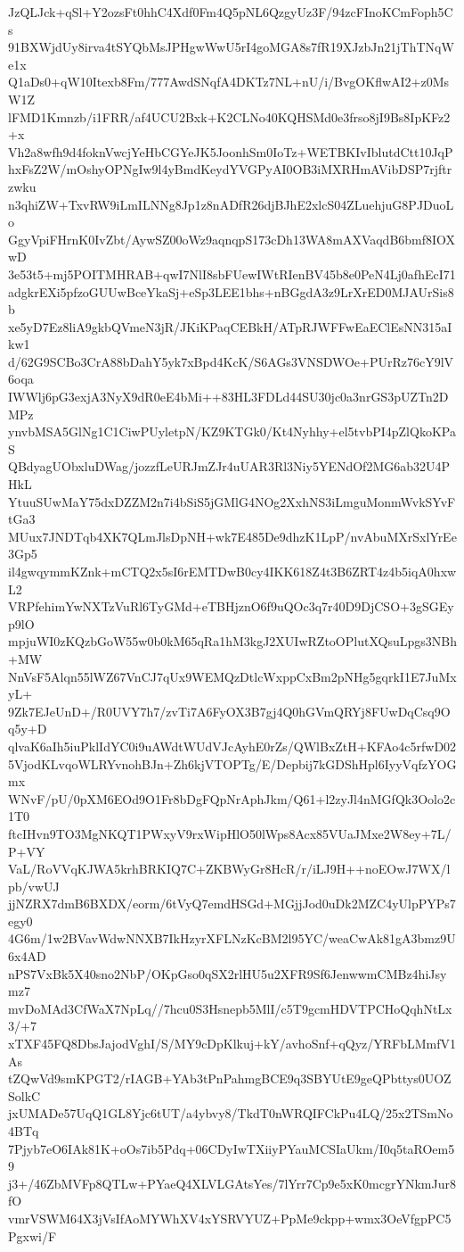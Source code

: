 JzQLJck+qSl+Y2ozsFt0hhC4Xdf0Fm4Q5pNL6QzgyUz3F/94zcFInoKCmFoph5Cs
91BXWjdUy8irva4tSYQbMsJPHgwWwU5rI4goMGA8s7fR19XJzbJn21jThTNqWe1x
Q1aDs0+qW10Itexb8Fm/777AwdSNqfA4DKTz7NL+nU/i/BvgOKflwAI2+z0MsW1Z
lFMD1Kmnzb/i1FRR/af4UCU2Bxk+K2CLNo40KQHSMd0e3frso8jI9Bs8IpKFz2+x
Vh2a8wfh9d4foknVwcjYeHbCGYeJK5JoonhSm0IoTz+WETBKIvIblutdCtt10JqP
hxFsZ2W/mOshyOPNgIw9l4yBmdKeydYVGPyAI0OB3iMXRHmAVibDSP7rjftrzwku
n3qhiZW+TxvRW9iLmILNNg8Jp1z8nADfR26djBJhE2xlcS04ZLuehjuG8PJDuoLo
GgyVpiFHrnK0IvZbt/AywSZ00oWz9aqnqpS173cDh13WA8mAXVaqdB6bmf8IOXwD
3e53t5+mj5POITMHRAB+qwI7NlI8sbFUewIWtRIenBV45b8e0PeN4Lj0afhEcI71
adgkrEXi5pfzoGUUwBceYkaSj+eSp3LEE1bhs+nBGgdA3z9LrXrED0MJAUrSis8b
xe5yD7Ez8liA9gkbQVmeN3jR/JKiKPaqCEBkH/ATpRJWFFwEaEClEsNN315aIkw1
d/62G9SCBo3CrA88bDahY5yk7xBpd4KcK/S6AGs3VNSDWOe+PUrRz76cY9lV6oqa
IWWlj6pG3exjA3NyX9dR0eE4bMi++83HL3FDLd44SU30jc0a3nrGS3pUZTn2DMPz
ynvbMSA5GlNg1C1CiwPUyletpN/KZ9KTGk0/Kt4Nyhhy+el5tvbPI4pZlQkoKPaS
QBdyagUObxluDWag/jozzfLeURJmZJr4uUAR3Rl3Niy5YENdOf2MG6ab32U4PHkL
YtuuSUwMaY75dxDZZM2n7i4bSiS5jGMlG4NOg2XxhNS3iLmguMonmWvkSYvFtGa3
MUux7JNDTqb4XK7QLmJlsDpNH+wk7E485De9dhzK1LpP/nvAbuMXrSxlYrEe3Gp5
il4gwqymmKZnk+mCTQ2x5sI6rEMTDwB0cy4IKK618Z4t3B6ZRT4z4b5iqA0hxwL2
VRPfehimYwNXTzVuRl6TyGMd+eTBHjznO6f9uQOc3q7r40D9DjCSO+3gSGEyp9lO
mpjuWI0zKQzbGoW55w0b0kM65qRa1hM3kgJ2XUIwRZtoOPlutXQsuLpgs3NBh+MW
NnVsF5Alqn55lWZ67VnCJ7qUx9WEMQzDtlcWxppCxBm2pNHg5gqrkI1E7JuMxyL+
9Zk7EJeUnD+/R0UVY7h7/zvTi7A6FyOX3B7gj4Q0hGVmQRYj8FUwDqCsq9Oq5y+D
qlvaK6aIh5iuPklIdYC0i9uAWdtWUdVJcAyhE0rZs/QWlBxZtH+KFAo4c5rfwD02
5VjodKLvqoWLRYvnohBJn+Zh6kjVTOPTg/E/Depbij7kGDShHpl6IyyVqfzYOGmx
WNvF/pU/0pXM6EOd9O1Fr8bDgFQpNrAphJkm/Q61+l2zyJl4nMGfQk3Oolo2c1T0
ftcIHvn9TO3MgNKQT1PWxyV9rxWipHlO50lWps8Acx85VUaJMxe2W8ey+7L/P+VY
VaL/RoVVqKJWA5krhBRKIQ7C+ZKBWyGr8HcR/r/iLJ9H++noEOwJ7WX/lpb/vwUJ
jjNZRX7dmB6BXDX/eorm/6tVyQ7emdHSGd+MGjjJod0uDk2MZC4yUlpPYPs7egy0
4G6m/1w2BVavWdwNNXB7IkHzyrXFLNzKcBM2l95YC/weaCwAk81gA3bmz9U6x4AD
nPS7VxBk5X40sno2NbP/OKpGso0qSX2rlHU5u2XFR9Sf6JenwwmCMBz4hiJsymz7
mvDoMAd3CfWaX7NpLq//7hcu0S3Hsnepb5MlI/c5T9gcmHDVTPCHoQqhNtLx3/+7
xTXF45FQ8DbsJajodVghI/S/MY9cDpKlkuj+kY/avhoSnf+qQyz/YRFbLMmfV1As
tZQwVd9smKPGT2/rIAGB+YAb3tPnPahmgBCE9q3SBYUtE9geQPbttys0UOZSolkC
jxUMADe57UqQ1GL8Yjc6tUT/a4ybvy8/TkdT0nWRQIFCkPu4LQ/25x2TSmNo4BTq
7Pjyb7eO6IAk81K+oOs7ib5Pdq+06CDyIwTXiiyPYauMCSIaUkm/I0q5taROem59
j3+/46ZbMVFp8QTLw+PYaeQ4XLVLGAtsYes/7lYrr7Cp9e5xK0mcgrYNkmJur8fO
vmrVSWM64X3jVsIfAoMYWhXV4xYSRVYUZ+PpMe9ckpp+wmx3OeVfgpPC5Pgxwi/F
